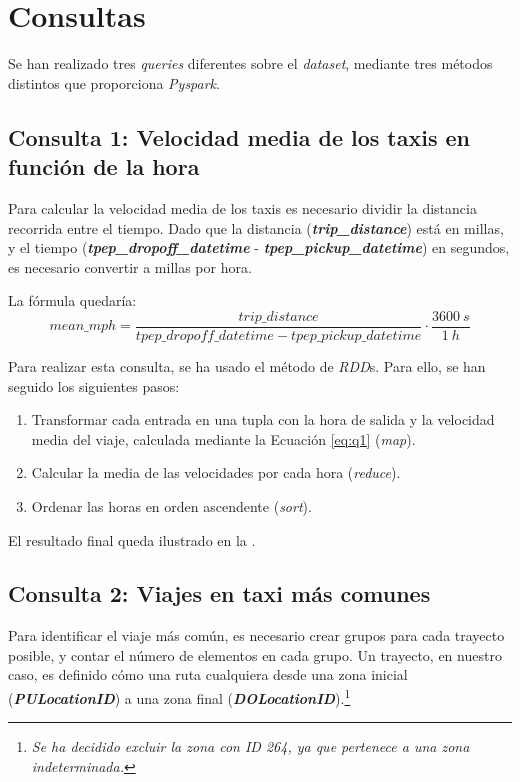 \section{Consultas}
Se han realizado tres \textit{queries} diferentes sobre el \textit{dataset}, mediante tres métodos distintos que proporciona \textit{Pyspark}.


\subsection{Consulta 1: Velocidad media de los taxis en función de la hora}
Para calcular la velocidad media de los taxis es necesario dividir la distancia recorrida entre el tiempo. Dado que la distancia (\textbf{\textit{trip\_distance}}) está en millas, y el tiempo (\textbf{\textit{tpep\_dropoff\_datetime}} - \textbf{\textit{tpep\_pickup\_datetime}}) en segundos, es necesario convertir a millas por hora.

La fórmula quedaría:
\begin{equation}\label{eq:q1}
  mean\_mph = \frac{trip\_distance}{tpep\_dropoff\_datetime - tpep\_pickup\_datetime} \cdot \frac{3600\ s}{1\ h}
\end{equation}


Para realizar esta consulta, se ha usado el método de \textit{RDD}s. Para ello, se han seguido los siguientes pasos:
\begin{enumerate}
  \item Transformar cada entrada en una tupla con la hora de salida y la velocidad media del viaje, calculada mediante la Ecuación \ref{eq:q1} (\textit{map}).
  \item Calcular la media de las velocidades por cada hora (\textit{reduce}).
  \item Ordenar las horas en orden ascendente (\textit{sort}).
\end{enumerate}

\noindent
El resultado final queda ilustrado en la .




\subsection{Consulta 2: Viajes en taxi más comunes}
Para identificar el viaje más común, es necesario crear grupos para cada trayecto posible, y contar el número de elementos en cada grupo.
Un trayecto, en nuestro caso, es definido cómo una ruta cualquiera desde una zona inicial (\textbf{\textit{PULocationID}}) a una zona final (\textbf{\textit{DOLocationID}}).\footnote{\textit{Se ha decidido excluir la zona con ID 264, ya que pertenece a una zona indeterminada.}}

